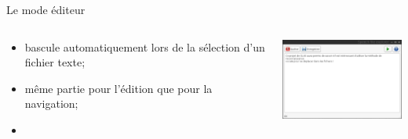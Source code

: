 \documentclass{beamer}
\begin{document}
\begin{frame}{Le mode éditeur}

	\begin{columns}[c]
	
	\begin{column}{5cm}
	\begin{itemize}
		\item bascule automatiquement lors de la sélection d'un fichier texte;
		\item même partie pour l'édition que pour la navigation;
		\item 
	\end{itemize}
  	\end{column}
	\begin{column}{5cm}
		\includegraphics[width=5cm]{editor}\\
  	\end{column}
  	
  	\normalsize
	
	\end{columns}


\end{frame}




	
\end{document}
